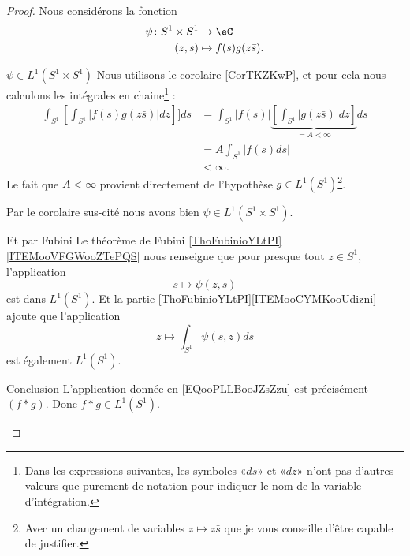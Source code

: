 \begin{proof}
    Nous considérons la fonction
    \begin{equation}
        \begin{aligned}
            \psi\colon S^1\times S^1&\to \eC \\
            (z,s)&\mapsto f(s)g(z\bar s). 
        \end{aligned}
    \end{equation}
    \begin{subproof}
    \item[\( \psi\in L^1(S^1\times S^1)\)]
        Nous utilisons le corolaire \ref{CorTKZKwP}, et pour cela nous calculons les intégrales en chaine\footnote{Dans les expressions suivantes, les symboles «\( ds\)» et «\( dz\)» n'ont pas d'autres valeurs que purement de notation pour indiquer le nom de la variable d'intégration.} :
        \begin{subequations}
            \begin{align}
                \int_{S^1}\left[ \int_{S^1}| f(s)g(z\bar s) |dz \right]]ds&=\int_{S^1}| f(s) |\underbrace{\left[ \int_{S^1}| g(z\bar s) |dz \right]}_{=A<\infty}ds\\
                &=A\int_{S^1}| f(s)ds |\\
                &<\infty.
            \end{align}
        \end{subequations}
        Le fait que \( A<\infty\) provient directement de l'hypothèse \( g\in L^1(S^1)\)\footnote{Avec un changement de variables \( z\mapsto z\bar s\) que je vous conseille d'être capable de justifier.}.
        
        Par le corolaire sus-cité nous avons bien \( \psi\in L^1(S^1\times S^1)\).
    \item[Et par Fubini]
        Le théorème de Fubini \ref{ThoFubinioYLtPI}\ref{ITEMooVFGWooZTePQS} nous renseigne que pour presque tout \( z\in S^1\), l'application
        \begin{equation}
            s\mapsto \psi(z,s)
        \end{equation}
        est dans \( L^1(S^1)\). Et la partie \ref{ThoFubinioYLtPI}\ref{ITEMooCYMKooUdizni} ajoute que l'application
        \begin{equation}        \label{EQooPLLBooJZsZzu}
            z\mapsto \int_{S^1}\psi(s,z)ds
        \end{equation}
        est également \( L^1(S^1)\).
    \item[Conclusion]
        L'application donnée en \eqref{EQooPLLBooJZsZzu} est précisément \( (f*g)\). Donc \( f*g\in L^1(S^1)\).
    \end{subproof}
\end{proof}

